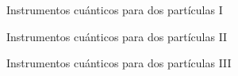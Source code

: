 \documentclass[svgnames,12pt,aspectratio=149]{beamer}
\begin{document}
\begin{frame}{Instrumentos cuánticos para dos partículas I}

\begin{figure}[H]
\centering
{}
\caption*{}
\end{figure} 




\end{frame}

\begin{frame}{Instrumentos cuánticos para dos partículas II}
\begin{figure}[H]
\centering
{}
\caption*{} 
\end{figure} 

\end{frame}

\begin{frame}{Instrumentos cuánticos para dos partículas III}
\begin{figure}[H]
    \centering
{}
\caption*{} 
\end{figure} 
\end{frame}
\end{document}
